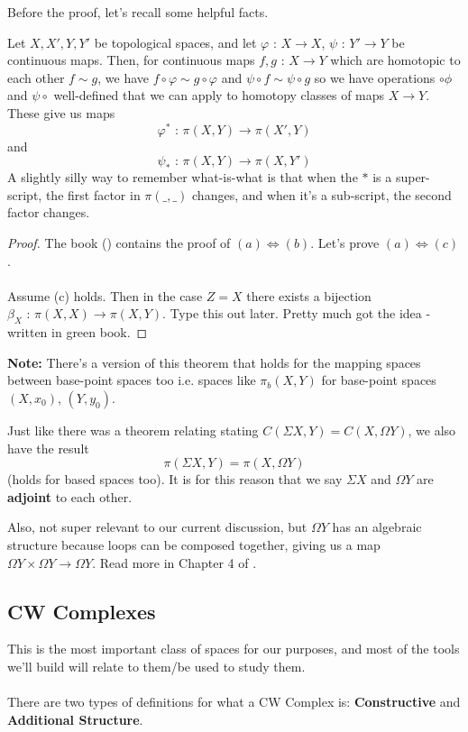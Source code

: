 \documentclass[11pt]{article}
\begin{document}
Before the proof, let's recall some helpful facts.

\begin{dottedbox}
  Let $X, X', Y, Y'$ be topological spaces, and let $\varphi \text{ : } X \rightarrow X$, $\psi \text{ : } Y' \rightarrow Y$ be continuous maps. Then, for continuous maps $f, g \text{ : } X \rightarrow Y$ which are homotopic to each other $f \sim g$, we have $f \circ \varphi \sim g \circ \varphi$ and $\psi \circ f \sim \psi \circ g$ so we have operations $\circ \phi$ and $\psi \circ$ well-defined that we can apply to homotopy classes of maps $X \rightarrow Y$. These give us maps $$\varphi^* \text{ : } \pi(X, Y) \rightarrow \pi(X', Y)$$ and $$\psi_* \text{ : } \pi(X, Y) \rightarrow \pi(X, Y')$$
  A slightly silly way to remember what-is-what is that when the $*$ is a super-script, the first factor in $\pi(\_, \_)$ changes, and when it's a sub-script, the second factor changes.
\end{dottedbox}


\begin{proof}
  The book (\cite{FomenkoFuchs16}) contains the proof of $(a) \iff (b)$. Let's prove $(a) \iff (c)$.
  \\
  \\
  Assume (c) holds. Then in the case $Z = X$ there exists a bijection $\beta_X \text{ : } \pi(X, X) \rightarrow \pi(X, Y)$. Type this out later. Pretty much got the idea - written in green book.
\end{proof} \textbf{Note:} There's a version of this theorem that holds for the mapping spaces between base-point spaces too i.e. spaces like $\pi_b(X, Y)$ for base-point spaces $(X, x_0)$, $(Y, y_0)$. 
\begin{redbox}
  Just like there was a theorem relating stating $C(\Sigma X, Y) = C(X, \Omega Y)$, we also have the result $$ \pi(\Sigma X, Y) = \pi(X, \Omega Y) $$ (holds for based spaces too). It is for this reason that we say $\Sigma X$ and $\Omega Y$ are \textbf{adjoint} to each other.
\end{redbox}

\begin{remark}
  {Also, not super relevant to our current discussion, but $\Omega Y$ has an algebraic structure because loops can be composed together, giving us a map $\Omega Y \times \Omega Y \rightarrow \Omega Y$. Read more in Chapter 4 of \cite{FomenkoFuchs16}.}
\end{remark}
\vskip 0.5cm

\subsection{CW Complexes}
This is the most important class of spaces for our purposes, and most of the tools we'll build will relate to them/be used to study them.
\\
\\
There are two types of definitions for what a CW Complex is: \textbf{Constructive} and \textbf{Additional Structure}.
\end{document}
